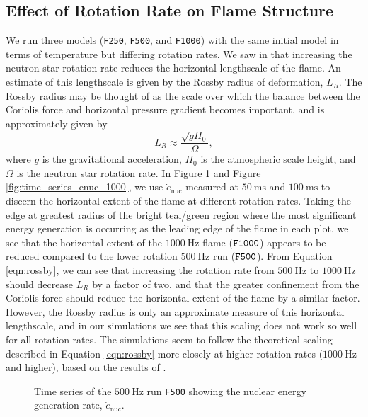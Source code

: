 \documentclass[preprint,times,tighten]{aastex63}
\begin{document}
\subsection{Effect of Rotation Rate on Flame Structure}\label{ssec:rot_structure}

We run three models ({\tt F250}, {\tt F500}, and {\tt F1000}) with the same initial model in terms 
of temperature but differing rotation rates. We saw in \citet{flame_wave1} that 
increasing the neutron star rotation rate reduces the horizontal lengthscale of the flame. An 
estimate of this lengthscale is given by the Rossby radius of deformation, $L_R$. The Rossby radius 
may be thought of as the scale over which the balance between the Coriolis force and horizontal 
pressure gradient becomes important, and is approximately given by
\begin{equation}
	\label{eqn:rossby}
	L_R \approx \frac{\sqrt{g H_0}}{\Omega},
\end{equation}
where $g$ is the gravitational acceleration, $H_0$ is the atmospheric scale height, and $\Omega$ is the 
neutron star rotation rate. In Figure \ref{fig:time_series_enuc_500} and Figure 
\ref{fig:time_series_enuc_1000}, we use $\dot{e}_\mathrm{nuc}$ measured at $50~\mathrm{ms}$ and $100~\mathrm{ms}$ to discern the horizontal extent of the flame at different rotation rates. Taking the edge at greatest radius of the bright teal/green region where the most significant energy generation is occurring as the leading edge of the flame in each plot, we see that the horizontal extent of the $1000~\mathrm{Hz}$ flame ($\tt{F1000}$) appears to be 
reduced compared to the lower rotation $500~\mathrm{Hz}$ run ($\tt{F500}$). From Equation 
\ref{eqn:rossby}, we can see that increasing the rotation rate from $500~\mathrm{Hz}$ to 
$1000~\mathrm{Hz}$ should decrease $L_R$ by a factor of two, and that the greater confinement from 
the Coriolis force should reduce the horizontal extent of the flame by a similar factor. However, 
the Rossby radius is only an approximate measure of this horizontal lengthscale, and in our 
simulations we see that this scaling does not work so well for all rotation rates. The simulations 
seem to follow the theoretical scaling described in Equation \ref{eqn:rossby} more closely at 
higher rotation rates ($1000~\mathrm{Hz}$ and higher), based on the results of \citet{flame_wave1}.

\begin{figure}[t]
\centering
{}
\caption{\label{fig:time_series_enuc_500} Time series of the $500~\mathrm{Hz}$ run {\tt F500} showing the nuclear energy generation rate, $\dot{e}_\mathrm{nuc}$.}
\end{figure}
\end{document}
